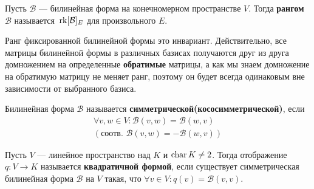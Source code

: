 \documentclass[../main.tex]{subfiles}
\begin{document}
\begin{definition}
  Пусть $\mathcal{B}$ --- билинейная форма на конечномерном пространстве $V$. Тогда \textbf{рангом $\mathcal{B}$} называется~$\operatorname{rk} [\mathcal{B}]_E$ для произвольного $E$.
\end{definition}

\begin{remark}
  Ранг фиксированной билинейной формы это инвариант. Действительно, все матрицы билинейной формы в различных базисах получаются друг из друга домножением на определенные \textbf{обратимые} матрицы, а как мы знаем домножение на обратимую матрицу не меняет ранг, поэтому он будет всегда одинаковым вне зависимости от выбранного базиса.
\end{remark}

\begin{definition}
  Билинейная форма $\mathcal{B}$ называется \textbf{симметрической(кососимметрической)}, если
  \begin{equation*}
    \begin{gathered}
      \forall v, w \in V\colon \mathcal{B}(v, w) = \mathcal{B}(w, v) \\
      (\text{соотв. } \mathcal{B}(v, w) = -\mathcal{B}(w, v))
    \end{gathered}
  \end{equation*}
\end{definition}

\begin{definition}
  Пусть $V$ --- линейное пространство над $K$ и $\operatorname{char} K \neq 2$. Тогда отображение $q\colon V \to K$ называется \textbf{квадратичной формой}, если существует симметрическая билинейная форма $\mathcal{B}$ на $V$ такая, что $\forall v \in V\colon q(v) = \mathcal{B}(v, v)$.
\end{definition}
\end{document}
